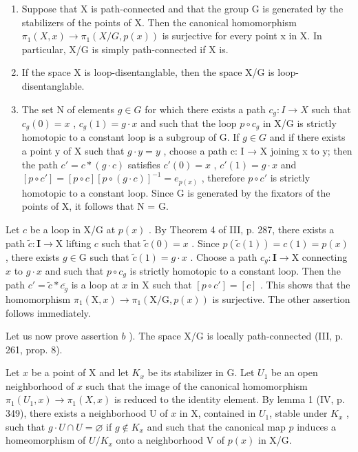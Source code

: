 \begin{enumerate}
\def\labelenumi{\alph{enumi})}
\item
  Suppose that X is path-connected and that the group G is generated by the stabilizers of the points of X. Then the canonical homomorphism \(\pi_{1}(X,x)\to\pi_{1}(X/G,p(x))\) is surjective for every point x in X. In particular, X/G is simply path-connected if X is.
\item
  If the space X is loop-disentanglable, then the space X/G is loop-disentanglable.
\item
  The set N of elements \(g \in G\) for which there exists a path \(c_{g} \colon I \to X\) such that \(c_{g}(0) = x\) , \(c_{g}(1) = g \cdot x\) and such that the loop \(p \circ c_{g}\) in X/G is strictly homotopic to a constant loop is a subgroup of G. If \(g \in G\) and if there exists a point y of X such that \(g \cdot y = y\) , choose a path c: I → X joining x to y; then the path \(c' = c * (g \cdot c)\) satisfies \(c'(0) = x\) , \(c'(1) = g \cdot x\) and \([p \circ c'] = [p \circ c][p \circ (g \cdot c)]^{-1} = e_{p(x)}\) , therefore \(p \circ c'\) is strictly homotopic to a constant loop. Since G is generated by the fixators of the points of X, it follows that N = G.
\end{enumerate}

Let \(c\) be a loop in X/G at \(p(x)\) . By Theorem 4 of III, p. 287, there exists a path \(\widetilde{c} \colon \mathbf{I} \to \mathrm{X}\) lifting \(c\) such that \(\widetilde{c}(0) = x\) . Since \(p(\widetilde{c}(1)) = c(1) = p(x)\) , there exists \(g \in \mathrm{G}\) such that \(\widetilde{c}(1) = g \cdot x\) . Choose a path \(c_g \colon \mathbf{I} \to \mathrm{X}\) connecting \(x\) to \(g \cdot x\) and such that \(p \circ c_g\) is strictly homotopic to a constant loop. Then the path \(c' = \widetilde{c} * \overline{c_g}\) is a loop at \(x\) in X such that \([p \circ c'] = [c]\) . This shows that the homomorphism \(\pi_1(\mathrm{X}, x) \to \pi_1(\mathrm{X/G}, p(x))\) is surjective. The other assertion follows immediately.

Let us now prove assertion \(b\) ). The space X/G is locally path-connected (III, p. 261, prop. 8).

Let \(x\) be a point of X and let \(K_x\) be its stabilizer in G. Let \(U_1\) be an open neighborhood of \(x\) such that the image of the canonical homomorphism \(\pi_1(U_1, x) \to \pi_1(X, x)\) is reduced to the identity element. By lemma 1 (IV, p. 349), there exists a neighborhood U of \(x\) in X, contained in \(U_1\), stable under \(K_x\) , such that \(g \cdot U \cap U = \varnothing\) if \(g \notin K_x\) and such that the canonical map \(p\) induces a homeomorphism of \(U/K_x\) onto a neighborhood V of \(p(x)\) in X/G.


